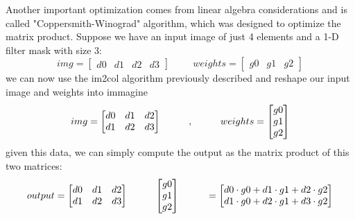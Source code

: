 \documentclass[a4paper, 10pt]{book}
\begin{document}
Another important optimization comes from linear algebra considerations and is called "Coppersmith-Winograd" algorithm, which was designed to optimize the matrix product. 
Suppose we have an input image of just 4 elements and a 1-D filter mask with size 3:
\begin{equation}
    \label{img_matrix}
img = \begin{bmatrix} 
	d0 & d1 & d2 & d3
	\end{bmatrix}
 \hspace{1cm}
weights = \begin{bmatrix} 
	g0 & g1 & g2
	\end{bmatrix}
\end{equation}
we can now use the im2col algorithm previously described and reshape our input image
and weights into
immagine
\begin{equation}
    \label{img_matrix_reshape}
img = \begin{bmatrix} 
	d0 & d1 & d2 \\
        d1 & d2 & d3 \\
 
	\end{bmatrix}
 \hspace* {1cm} ,  \hspace* {1cm}
weights = \begin{bmatrix} 
	g0 \\ 
        g1 \\ 
        g2
	\end{bmatrix}
\end{equation}
given this data, we can simply compute the output as the matrix product of this two
matrices:
\begin{equation}
    \label{output_matrix}
output = \begin{bmatrix} 
	d0 & d1 & d2 \\
        d1 & d2 & d3 
 
	\end{bmatrix}
 \hspace* {1cm}
    \begin{bmatrix} 
	g0 \\ 
        g1 \\ 
        g2
	\end{bmatrix}
\hspace* {1cm}
 = \begin{bmatrix} 
	d0\cdot g0 + d1 \cdot g1 + d2 \cdot g2 \\
        d1\cdot g0 + d2 \cdot g1 + d3 \cdot g2 \\
        \end{bmatrix}
        \end{equation}
\end{document}
